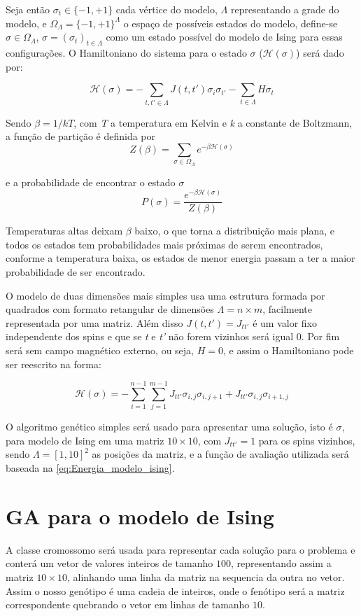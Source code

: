 Seja então \( \sigma_t \in \{ -1, +1 \} \) cada vértice do modelo, \(\Lambda\) representando a grade do modelo, e \(\Omega_{\Lambda} = \{-1, +1 \} ^ {\Lambda} \) o espaço de possíveis estados do modelo, define-se \(\sigma \in  \Omega_{\Lambda}\), \( \sigma = (\sigma_t)_{t \in \Lambda} \) como um estado possível do modelo de Ising para essas configurações. O Hamiltoniano do sistema para o estado \(\sigma\) (\(\mathcal{H}(\sigma)\)) será dado por: 

\[ \mathcal{H}(\sigma) = -\sum_{t,t' \in \Lambda}J(t,t')\sigma_{i}\sigma_{t'} -\sum_{t \in \Lambda}H \sigma_t \]

Sendo \(\beta = 1/kT\), com \textit{T} a temperatura em Kelvin e \textit{k} a constante de Boltzmann, a função de partição é definida por
\[ Z(\beta) = \sum_{\sigma \in \Omega_{\Lambda}} e^{-\beta \mathcal{H}(\sigma)} \]

e a probabilidade de encontrar o estado \(\sigma \)
\[ P(\sigma) = \frac{e^{-\beta \mathcal{H}(\sigma)}}{Z(\beta)} \]

Temperaturas altas deixam \(\beta\) baixo, o que torna a distribuição mais plana, e todos os estados tem probabilidades mais próximas de serem encontrados, conforme a temperatura baixa, os estados de menor energia passam a ter a maior probabilidade de ser encontrado.

O modelo de duas dimensões mais simples usa uma estrutura formada por quadrados com formato retangular de dimensões \(\Lambda = n \times m\), facilmente representada por uma matriz. Além disso \(J(t, t') = J_{tt'}\) é um valor fixo independente dos spins e que se \textit{t} e \textit{t'} não forem vizinhos será igual 0. Por fim será sem campo magnético externo, ou seja, \(H = 0\), e assim o Hamiltoniano pode ser reescrito na forma:

\begin{equation}
\mathcal{H}(\sigma) = - \sum_{i = 1}^{n-1} \sum_{j = 1}^{m-1} J_{tt'}\sigma_{i,j}\sigma_{i,j+1} + J_{tt'}\sigma_{i,j}\sigma_{i+1,j}
\label{eq:Energia_modelo_ising}
\end{equation}

O algoritmo genético simples será usado para apresentar uma solução, isto é \(\sigma\), para modelo de Ising em uma matriz \(10 \times 10\), com \(J_{tt'} = 1\) para os spins vizinhos, sendo \(\Lambda = \left[1,10\right]^2\) as posições da matriz, e a função de avaliação utilizada será baseada na \autoref{eq:Energia_modelo_ising}.

\section{GA para o modelo de Ising}
A classe cromossomo será usada para representar cada solução para o problema e conterá um vetor de valores inteiros de tamanho $100$, representando assim a matriz \( 10 \times 10 \), alinhando uma linha da matriz na sequencia da outra no vetor. Assim o nosso genótipo é uma cadeia de inteiros, onde o fenótipo será a matriz correspondente quebrando o vetor em linhas de tamanho $10$.

